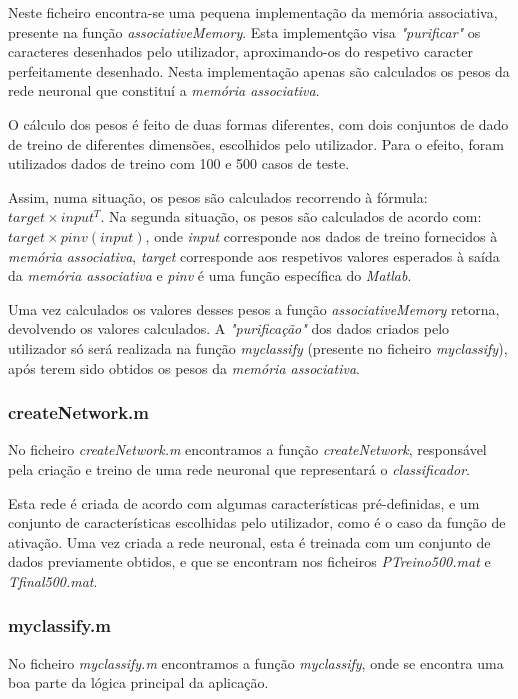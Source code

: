 \documentclass{article}
\begin{document}
Neste ficheiro encontra-se uma pequena implementação da memória associativa, presente na função \emph{associativeMemory}. Esta implementção visa \emph{"purificar"} os caracteres desenhados pelo utilizador, aproximando-os do respetivo caracter perfeitamente desenhado. Nesta implementação apenas são calculados os pesos da rede neuronal que constituí a \emph{memória associativa}.

O cálculo dos pesos é feito de duas formas diferentes, com dois conjuntos de dado de treino de diferentes dimensões, escolhidos pelo utilizador. Para o efeito, foram utilizados dados de treino com 100 e 500 casos de teste.

Assim, numa situação, os pesos são calculados recorrendo à fórmula: $target\times input^T$. Na segunda situação, os pesos são calculados de acordo com: $target\times pinv(input)$, onde \emph{input} corresponde aos dados de treino fornecidos à \emph{memória associativa}, \emph{target} corresponde aos respetivos valores esperados à saída da \emph{memória associativa} e \emph{pinv} é uma função específica do \emph{Matlab}.

Uma vez calculados os valores desses pesos a função \emph{associativeMemory} retorna, devolvendo os valores calculados. A \emph{"purificação"} dos dados criados pelo utilizador só será realizada na função \emph{myclassify} (presente no ficheiro \emph{myclassify}), após terem sido obtidos os pesos da \emph{memória associativa}.

\subsubsection{createNetwork.m}

No ficheiro \emph{createNetwork.m} encontramos a função \emph{createNetwork}, responsável pela criação e treino de uma rede neuronal que representará o \emph{classificador}.

Esta rede é criada de acordo com algumas características pré-definidas, e um conjunto de características escolhidas pelo utilizador, como é o caso da função de ativação. Uma vez criada a rede neuronal, esta é treinada com um conjunto de dados previamente obtidos, e que se encontram nos ficheiros \emph{PTreino500.mat} e \emph{Tfinal500.mat}.

\subsubsection{myclassify.m}

No ficheiro \emph{myclassify.m} encontramos a função \emph{myclassify}, onde se encontra uma boa parte da lógica principal da aplicação.
\end{document}
